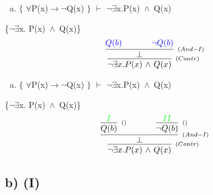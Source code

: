 \documentclass[aspectratio=43]{beamer}
\newcommand{\ria}{$\rightarrow$}
\newcommand{\fall}{$\forall$}
\newcommand{\ex}{$\exists$}
\newcommand{\nao}{$\neg$}
\newcommand{\nex}{\nao\ex}
\newcommand{\andd}{$\wedge$}
\begin{document}
    \begin{frame}[fragile]
    	
    	\begin{enumerate}[b)]
			
			\item $\{$ \fall P(x)\ria \nao Q(x) $\}$ $\vdash$ \nex  x.P(x)\ \andd\ Q(x) \\ 
			
		\end{enumerate}
        \{\nex  x. P(x)\ \andd\ Q(x)\}
        \vspace{95pt}
        \[
        \begin{array}{c}
		
        	\infer[_{(Contr)}]
            {$\nex$  x. P(x)\ $\andd$\ Q(x)}
            {\infer[_{(And-I)}] 
            	{\bot}
                { \textcolor{blue}{ Q(b) \hspace{35pt} \neg Q(b)}}
        	}
		\end{array}
        \]
        
	\end{frame}
    
    \begin{frame}[fragile]
    	
    	\begin{enumerate}[b)]
			
			\item $\{$ \fall P(x)\ria \nao Q(x) $\}$ $\vdash$ \nex  x.P(x)\ \andd\ Q(x) \\ 
			
		\end{enumerate}
        \{\nex  x. P(x)\ \andd\ Q(x)\}
        \vspace{100pt}
        \[
        \begin{array}{c}
		
        	\infer[_{(Contr)}]
            {$\nex$  x. P(x)\ $\andd$\ Q(x)}
            {\infer[_{(And-I)}] 
            	{\bot}
                {\infer[_{()}]
                	{Q(b)}
                    {\textcolor{green}{I}}
                \hspace{35pt} 
                \infer[_{()}]
                	{$\nao$Q(b)}
                    {\textcolor{green}{II}}
                }
        	}
		\end{array}
        \]
        
	\end{frame}
    
    \subsection{b) (I)}
    
\end{document}
